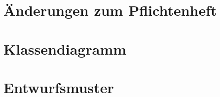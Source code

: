 \documentclass{report}
\begin{document}
	\section{Änderungen zum Pflichtenheft}
	\newpage
	\section{Klassendiagramm}
	\newpage
	\section{Entwurfsmuster}
	\newpage
\end{document}
